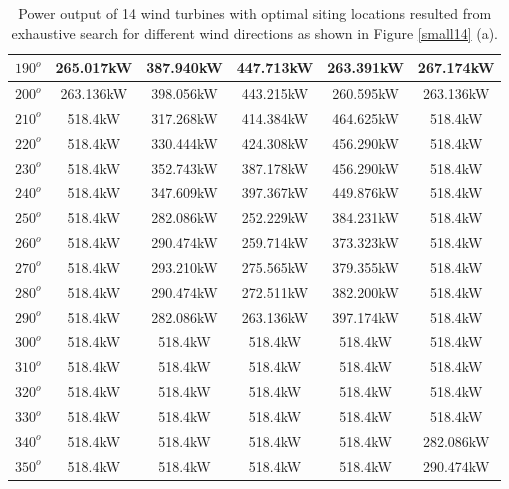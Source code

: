 \begin{table}[H]
\begin{tabular}{|c|c|c|c|c|c|}
        		$190^o$	& 265.017kW	& 387.940kW	& 447.713kW	& 263.391kW	& 267.174kW	\\ \hline
        		$200^o$	& 263.136kW	& 398.056kW	& 443.215kW	& 260.595kW	& 263.136kW	\\ \hline
        		$210^o$	& 518.4kW	& 317.268kW	& 414.384kW	& 464.625kW	& 518.4kW	\\ \hline
        		$220^o$	& 518.4kW	& 330.444kW	& 424.308kW	& 456.290kW	& 518.4kW	\\ \hline
        		$230^o$	& 518.4kW	& 352.743kW	& 387.178kW	& 456.290kW	& 518.4kW	\\ \hline
        		$240^o$	& 518.4kW	& 347.609kW	& 397.367kW	& 449.876kW	& 518.4kW	\\ \hline
        		$250^o$	& 518.4kW	& 282.086kW	& 252.229kW	& 384.231kW	& 518.4kW	\\ \hline
        		$260^o$	& 518.4kW	& 290.474kW	& 259.714kW	& 373.323kW	& 518.4kW	\\ \hline
        		$270^o$	& 518.4kW	& 293.210kW	& 275.565kW	& 379.355kW	& 518.4kW	\\ \hline
        		$280^o$	& 518.4kW	& 290.474kW	& 272.511kW	& 382.200kW	& 518.4kW	\\ \hline
        		$290^o$	& 518.4kW	& 282.086kW	& 263.136kW	& 397.174kW	& 518.4kW	\\ \hline
        		$300^o$	& 518.4kW	& 518.4kW	& 518.4kW	& 518.4kW	& 518.4kW	\\ \hline
        		$310^o$	& 518.4kW	& 518.4kW	& 518.4kW	& 518.4kW	& 518.4kW	\\ \hline
        		$320^o$	& 518.4kW	& 518.4kW	& 518.4kW	& 518.4kW	& 518.4kW	\\ \hline
        		$330^o$	& 518.4kW	& 518.4kW	& 518.4kW	& 518.4kW	& 518.4kW	\\ \hline
        		$340^o$	& 518.4kW	& 518.4kW	& 518.4kW	& 518.4kW	& 282.086kW	\\ \hline
        		$350^o$	& 518.4kW	& 518.4kW	& 518.4kW	& 518.4kW	& 290.474kW	\\ \hline
        	\end{tabular}
        	\caption{Power output of 14 wind turbines with optimal siting locations resulted from exhaustive search for different wind directions as shown in Figure \ref{small14} (a).}
        	\label{table14a}
        \end{table}
